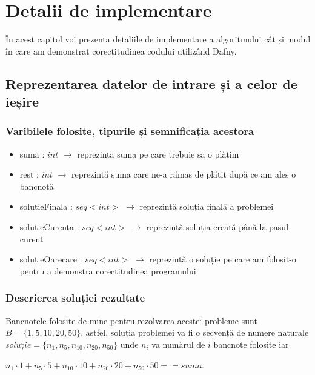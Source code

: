 
\chapter{Detalii de implementare}
În acest capitol voi prezenta detaliile de implementare a algoritmului cât și modul în care am demonstrat corectitudinea codului utilizând Dafny.
\section{Reprezentarea datelor de intrare și a celor de ieșire}

\subsection{Varibilele folosite, tipurile și semnificația acestora}

\begin{itemize}
	\item suma : $int$ $\rightarrow$ reprezintă suma pe care trebuie să o plătim 
	\item rest : $int$ $\rightarrow$ reprezintă suma care ne-a rămas de plătit după ce am ales o bancnotă
	\item solutieFinala : $seq<int>$ $\rightarrow$ reprezintă soluția finală a problemei 
	\item solutieCurenta : $seq<int>$ $\rightarrow$ reprezintă soluția creată până la pasul curent
	\item solutieOarecare  : $seq<int>$ $\rightarrow$ reprezintă o soluție pe care am folosit-o pentru a demonstra corectitudinea programului
\end{itemize}

\subsection{Descrierea soluției rezultate}
Bancnotele folosite de mine pentru rezolvarea acestei probleme sunt $B = \{1, 5, 10, 20, 50\}$, astfel, soluția problemei va fi o secvență de numere naturale $ soluție = \{n_1,n_5,n_{10},n_{20},n_{50} \}$ unde $n_i$ va numărul de $i$ bancnote folosite iar 
\begin{center}
	$n_1 \cdot 1 + n_5 \cdot 5 + n_{10} \cdot 10 + n_{20} \cdot 20 + n_{50} \cdot 50 == suma $.
\end{center}
\vspace{0.5cm}



